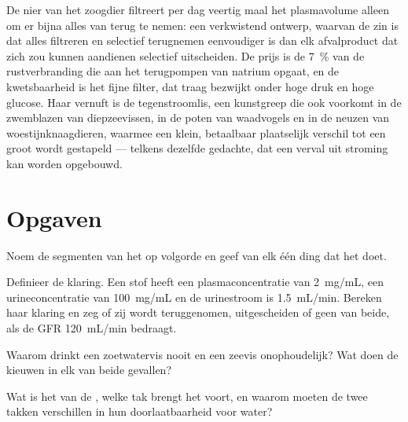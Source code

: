 \begin{remark}\label{rem:b3:renal-osmoregulation:design}
De nier van het zoogdier filtreert per dag veertig maal het
plasmavolume alleen om er bijna alles van terug te nemen: een
verkwistend ontwerp, waarvan de zin is dat alles filtreren en selectief
terugnemen eenvoudiger is dan elk afvalproduct dat zich zou kunnen
aandienen selectief uitscheiden. De prijs is de \qty{7}{\%} van de
rustverbranding die aan het terugpompen van natrium opgaat, en de
kwetsbaarheid is het fijne filter, dat traag bezwijkt onder hoge druk
en hoge glucose. Haar vernuft is de tegenstroomlis, een kunstgreep die
ook voorkomt in de zwemblazen van diepzeevissen, in de poten van
waadvogels en in de neuzen van woestijnknaagdieren, waarmee een klein,
betaalbaar plaatselijk verschil tot een groot wordt gestapeld ---
telkens dezelfde gedachte, dat een verval uit stroming kan worden
opgebouwd.
\end{remark}

\section{Opgaven}

\begin{exercise}[$\star$]\label{exo:b3:renal-osmoregulation:1}
Noem de segmenten van het  op volgorde en geef van elk één ding
dat het doet.
\end{exercise}

\begin{exercise}[$\star$]\label{exo:b3:renal-osmoregulation:2}
Definieer de klaring. Een stof heeft een plasmaconcentratie van
\qty{2}{mg/mL}, een urineconcentratie van \qty{100}{mg/mL} en de
urinestroom is \qty{1.5}{mL/min}. Bereken haar klaring en zeg of zij
wordt teruggenomen, uitgescheiden of geen van beide, als de GFR
\qty{120}{mL/min} bedraagt.
\end{exercise}

\begin{exercise}[$\star$]\label{exo:b3:renal-osmoregulation:3}
Waarom drinkt een zoetwatervis nooit en een zeevis onophoudelijk? Wat
doen de kieuwen in elk van beide gevallen?
\end{exercise}

\begin{exercise}[$\star$]\label{exo:b3:renal-osmoregulation:4}
Wat is het  van de , welke tak brengt
het voort, en waarom moeten de twee takken verschillen in hun
doorlaatbaarheid voor water?
\end{exercise}

